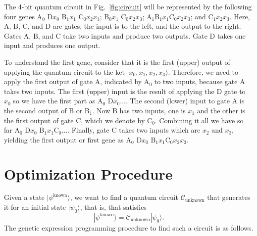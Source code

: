 \documentclass{article}
\begin{document}
The 4-bit quantum circuit in Fig.~\ref{fig:circuit} will be represented
by the following four genes A$_0$ D$x_0$  B$_1x_1$ C$_0x_2x_3$;
 B$_0x_1$ C$_0x_2x_3$; A$_1$B$_1x_1$C$_0x_2 x_3$; and C$_1x_2x_3$.
Here, A, B, C, and D are gates, the input is to the left, and the output to the right.
Gates A, B, and C take two inputs and produce two outputs. Gate D takes one input and produces one output.

To understand the first gene, consider that it is the first (upper) output of applying
the quantum circuit to the ket $|x_0, x_1, x_2, x_3\rangle$. Therefore, we need
to apply the first output of gate A, indicated by A$_0$ to two inputs, because
gate A takes two inputs. The first (upper) input is the result of applying the D gate
to $x_0$ so we have the first part as A$_0$ D$x_0\ldots$. The second (lower) input to gate
A is the second output of B or B$_1$. Now B has two inputs, one is $x_1$ and the other is
the first output of gate C, which we denote by C$_0$. Combining it all we have so far
A$_0$ D$x_0$ B$_1x_1$C$_0\ldots$. Finally, gate C takes two inputs which are $x_2$ and $x_3$,
yielding the first output or first gene as A$_0$ D$x_0$ B$_1x_1$C$_0x_2x_3$.

\section{Optimization Procedure}
Given a state $|\psi^{\textrm{known}}\rangle$, we want to find a quantum
circuit $\mathcal{C}_{\textrm{unknown}}$ that generates it for an initial state $|\psi_0\rangle$,
that is, that satisfies 
\begin{equation}
	|\psi^{\textrm{known}}\rangle=\mathcal{C}_{\textrm{unknown}}|\psi_0\rangle.
\end{equation}
The genetic expression programming procedure to find such a circuit is as follows.
\end{document}
